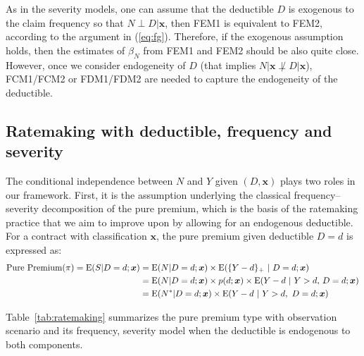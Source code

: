 \documentclass[11pt]{article}
\begin{document}
As in the severity models, one can assume that the deductible $D$ is exogenous to the claim frequency so that {$N \perp D|\bm{x}$}, then FEM1 is equivalent to 
FEM2, %
according to the argument in (\ref{eq:fg}). Therefore, if the exogenous assumption holds, then the estimates of $\beta_{N}$ from FEM1 and FEM2 should be also quite close. However, once we consider endogeneity of $D$ (that implies {$N|\bm{x} \not\perp D|\bm{x}$}), {FCM1/FCM2 or FDM1/FDM2 are needed to capture the endogeneity of the deductible.}


\subsection{Ratemaking with deductible, frequency and severity}

The conditional independence between $N$ and $Y$ given $(D,\bm{x})$ plays two roles in our framework. First, it is the assumption underlying the classical frequency--severity decomposition of the pure premium, which is the basis of the ratemaking practice that we aim to improve upon by allowing for an endogenous deductible. For a contract with classification $\bm{x}$, the pure premium given deductible $D=d$ is expressed as:
\begin{align}
	\text{Pure Premium}(\pi) = {\rm E}(S|D=d;\bm{x})&={\rm E}(N|D=d;\bm{x}) \times {\rm E}(\{Y-d\}_+\ |\ D=d;\bm{x})\nonumber \\
    &={\rm E}(N|D=d;\bm{x}) \times {p(d;\bm{x})}\times{\rm E}({Y-d\ |\ Y>d,}\ D=d;\bm{x})\nonumber\\
    &={\rm E}(N^*|D=d;\bm{x}) \times {\rm E}(Y-d\ |\ Y>d,\ D=d;\bm{x})\nonumber
\end{align}

Table~\ref{tab:ratemaking} summarizes the pure premium type with observation scenario and its frequency, severity model when the deductible is endogenous to both components.
\end{document}
